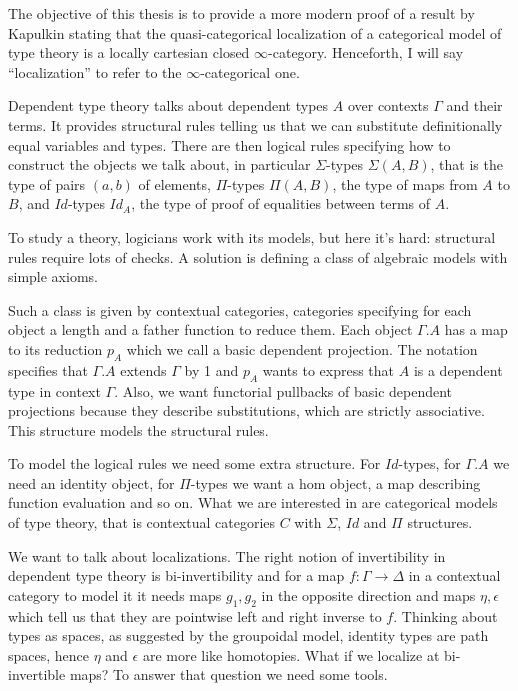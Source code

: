 \documentclass{minimal}
\newcommand{\Id}{Id}
\begin{document}
The objective of this thesis is to provide a more modern proof of a result by
Kapulkin stating that the quasi-categorical localization of a categorical model
of type theory is a locally cartesian closed $\infty$-category. Henceforth,
I will say ``localization'' to refer to the $\infty$-categorical one.

Dependent type theory talks about dependent types $A$ over contexts $\Gamma$ and
their terms. It provides structural rules telling us that we can
substitute definitionally equal variables and types. There are then logical
rules specifying how to construct the objects we talk about, in particular
$\Sigma$-types $\Sigma(A,B)$, that is the type of pairs $(a,b)$ of elements,
$\Pi$-types $\Pi(A,B)$, the type of maps from $A$ to $B$, and $\Id$-types
$\Id_A$, the type of proof of equalities between terms of $A$.

To study a theory, logicians work with its models, but here it's hard:
structural rules require lots of checks. A solution is defining a class of
algebraic models with simple axioms.

Such a class is given by contextual categories, categories specifying for each
object a length and a father function to reduce them. Each object $\Gamma.A$ has
a map to its reduction $p_A$ which we call a basic dependent projection. The
notation specifies that $\Gamma.A$ extends $\Gamma$ by 1 and $p_A$ wants to
express that $A$ is a dependent type in context $\Gamma$. Also, we want
functorial pullbacks of basic dependent projections because they
describe substitutions, which are strictly associative. This structure models
the structural rules.

To model the logical rules we need some extra structure. For $\Id$-types, for
$\Gamma.A$ we need an identity object, for $\Pi$-types we want a hom object,
a map describing function evaluation and so on. What we are interested in are
categorical models of type theory, that is contextual categories $C$ with
$\Sigma$, $\Id$ and $\Pi$ structures.

We want to talk about localizations. The right notion of invertibility in
dependent type theory is bi-invertibility and for a map
$f\colon\Gamma\rightarrow\Delta$ in a contextual category to model it it needs
maps $g_1,g_2$ in the opposite direction and maps $\eta,\epsilon$ which tell us
that they are pointwise left and right inverse to $f$. Thinking about types as
spaces, as suggested by the groupoidal model, identity types are path spaces,
hence $\eta$ and $\epsilon$ are more like homotopies. What if we localize at
bi-invertible maps? To answer that question we need some tools.
\end{document}
